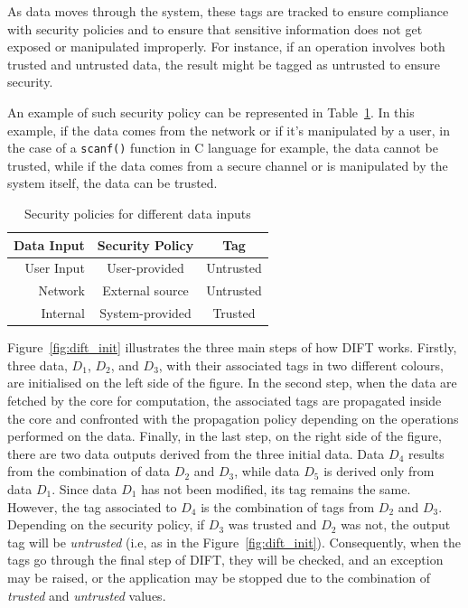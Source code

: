 As data moves through the system, these tags are tracked to ensure compliance with security policies and to ensure that sensitive information does not get exposed or manipulated improperly. For instance, if an operation involves both trusted and untrusted data, the result might be tagged as untrusted to ensure security.

An example of such security policy can be represented in Table~\ref{table:security_policies}. In this example, if the data comes from the network or if it's manipulated by a user, in the case of a \verb|scanf()| function in C language for example, the data cannot be trusted, while if the data comes from a secure channel or is manipulated by the system itself, the data can be trusted.

\begin{table}[ht]
    \centering
    \caption{Security policies for different data inputs}
    \label{table:security_policies}
    \begin{tabular}{@{}rcc@{}}
        \toprule
        \textbf{Data Input} & \textbf{Security Policy} & \textbf{Tag}     \\ \midrule
        User Input          & User-provided            & Untrusted        \\ \hline
        Network             & External source          & Untrusted        \\ \hline
        Internal            & System-provided          & Trusted          \\
        \bottomrule
    \end{tabular}
\end{table}

Figure~\ref{fig:dift_init} illustrates the three main steps of how DIFT works. Firstly, three data, $D_1$, $D_2$, and $D_3$, with their associated tags in two different colours, are initialised on the left side of the figure.
In the second step, when the data are fetched by the core for computation, the associated tags are propagated inside the core and confronted with the propagation policy depending on the operations performed on the data.
Finally, in the last step, on the right side of the figure, there are two data outputs derived from the three initial data. Data $D_4$ results from the combination of data $D_2$ and $D_3$, while data $D_5$ is derived only from data $D_1$. Since data $D_1$ has not been modified, its tag remains the same. However, the tag associated to $D_4$ is the combination of tags from $D_2$ and $D_3$. Depending on the security policy, if $D_3$ was trusted and $D_2$ was not, the output tag will be \textit{untrusted} (i.e, as in the Figure~\ref{fig:dift_init}). Consequently, when the tags go through the final step of DIFT, they will be checked, and an exception may be raised, or the application may be stopped due to the combination of \textit{trusted} and \textit{untrusted} values.

